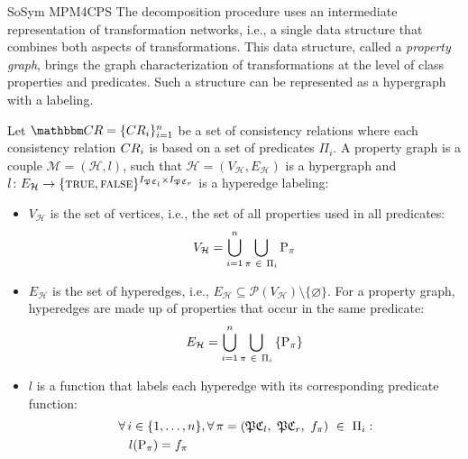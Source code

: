 \begin{copiedFrom}{SoSym MPM4CPS}
The decomposition procedure uses an intermediate representation of transformation networks, i.e., a single data structure that combines both aspects of transformations. This data structure, called a \textit{property graph}, brings the graph characterization of transformations at the level of class properties and predicates. Such a structure can be represented as a hypergraph with a labeling.

\begin{definition}
Let $\consistencyrelationset{CR} = \{\consistencyrelation{CR}{i}\}_{i = 1}^{n}$ be a set of consistency relations where each consistency relation $CR_{i}$ is based on a set of predicates $\Pi_i$. 
A property graph is a couple $\mathcal{M} =(\mathcal{H}, l)$, such that $\mathcal{H} = (V_{\mathcal{H}}, E_{\mathcal{H}})$ is a hypergraph and $l\colon E_{\mathcal{H}}\to \{\textsc{true}, \textsc{false}\}^{I_{\mathfrak{P}{\mathfrak{C}_{l}}} \times I_{\mathfrak{P}{\mathfrak{C}_{r}}}}$ is a hyperedge labeling:
        \begin{itemize}
            \item $V_{\mathcal{H}}$ is the set of vertices, i.e., the set of all properties used in all predicates:
\[V_{\mathcal{H}} = \bigcup_{i = 1}^{n} \bigcup_{\pi\ \in\ \Pi_{i}} \mathrm{P}_{\pi}\]
            \item $E_{\mathcal{H}}$ is the set of hyperedges, i.e., $E_{\mathcal{H}} \subseteq \mathcal{P}(V_{\mathcal{H}}) \setminus \{\varnothing\}$. For a property graph, hyperedges are made up of properties that occur in the same predicate:
\[E_{\mathcal{H}} = \bigcup_{i = 1}^{n} \bigcup_{\pi\ \in\ \Pi_{i}} \left\{\mathrm{P}_{\pi}\right\}\]
            \item $l$ is a function that labels each hyperedge with its corresponding predicate function:
\begin{align*}
    &\forall i \in \{1, \dots, n\}, \forall \pi = (\propertysettuple{P}{\classtuple{C}{l}},\ \propertysettuple{P}{\classtuple{C}{r}},\ f_\pi)\ \in\ \Pi_{i} :\\
    &\formulaskip l(\propertycollection{\pi}) = f_\pi
\end{align*}
        \end{itemize}
        \label{def:propertygraph}
\end{definition}


\end{copiedFrom}
